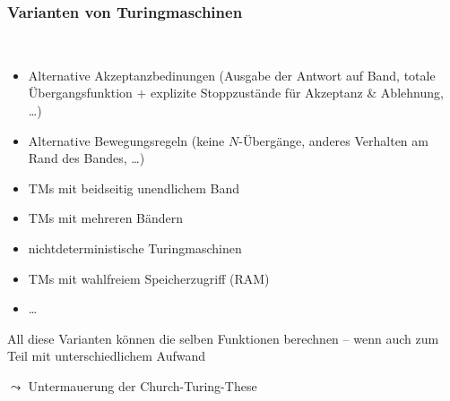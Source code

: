 \documentclass[aspectratio=1610,onlymath]{beamer}
\begin{document}
\begin{frame}\frametitle{Varianten von Turingmaschinen}

\\
\begin{itemize}
\item Alternative Akzeptanzbedinungen {\tiny(Ausgabe der Antwort auf Band, totale Übergangsfunktion + explizite Stoppzustände für Akzeptanz \& Ablehnung, \ldots)}
\item Alternative Bewegungsregeln {\tiny(keine $N$-Übergänge, anderes Verhalten am Rand des Bandes, \ldots)}
\item TMs mit beidseitig unendlichem Band
\item TMs mit mehreren Bändern
\item nichtdeterministische Turingmaschinen
\item TMs mit wahlfreiem Speicherzugriff (RAM)
\item \ldots
\end{itemize}

All diese Varianten können die selben Funktionen berechnen -- wenn auch zum Teil mit unterschiedlichem Aufwand
\medskip

$\leadsto$ Untermauerung der Church-Turing-These

\end{frame}
\end{document}
